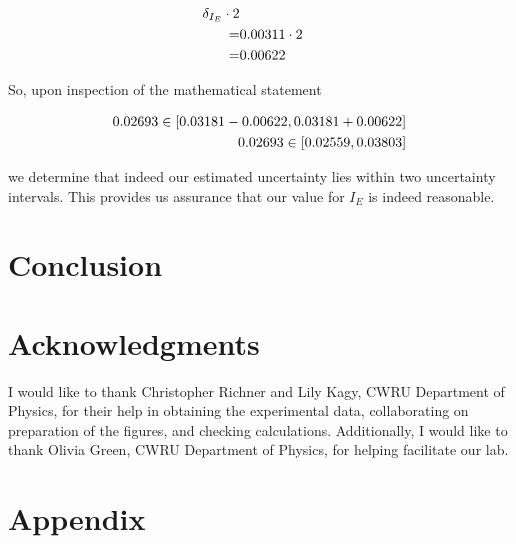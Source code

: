 \documentclass[coverpage]{article}
\begin{document}
	\begin{align}
		\delta_{I_E} \cdot 2 \notag \\
		=& 0.00311 \cdot 2 \notag \\
		=& 0.00622
	\end{align}

	So, upon inspection of the mathematical statement
	
	\begin{align}
		0.02693 \in [0.03181 - 0.00622, 0.03181 + 0.00622] \notag \\
		0.02693 \in [0.02559, 0.03803] \notag \\
	\end{align}

	we determine that indeed our estimated uncertainty lies within two uncertainty intervals. This provides us assurance that our value for $I_E$ is indeed reasonable. 
	
	\section{Conclusion}
	
	\section*{Acknowledgments}
	I would like to thank Christopher Richner and Lily Kagy, CWRU Department of Physics, for their help in obtaining the experimental data, collaborating on preparation of the figures, and checking calculations. Additionally, I would like to thank Olivia Green, CWRU Department of Physics, for helping facilitate our lab.
	
	
	\nocite{textbook}
	\nocite{labManual}
	
	
	\onecolumn
	
	\section{Appendix} \label{sect:appendix}
		
\end{document}
